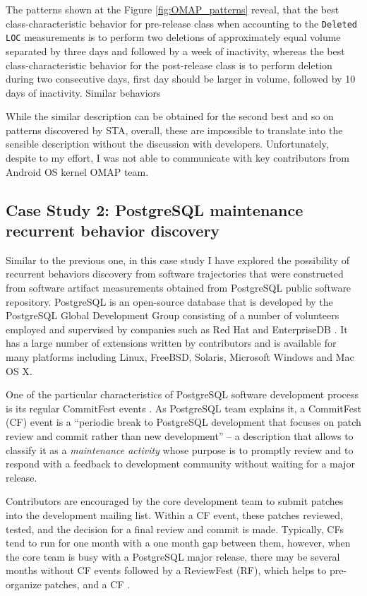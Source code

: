 The patterns shown at the Figure \ref{fig:OMAP_patterns} reveal, that the best class-characteristic behavior for pre-release class when accounting to the \texttt{Deleted LOC} measurements is to perform two deletions of approximately equal volume separated by three days and followed by a week of inactivity, whereas the best class-characteristic behavior for the post-release class is to perform deletion during two consecutive days, first day should be larger in volume, followed by 10 days of inactivity. Similar behaviors 

While the similar description can be obtained for the second best and so on patterns discovered by STA, overall, these are impossible to translate into the sensible description without the discussion with developers. Unfortunately, despite to my effort, I was not able to communicate with key contributors from Android OS kernel OMAP team.
\clearpage

\subsection{Case Study 2: PostgreSQL maintenance recurrent behavior discovery}
Similar to the previous one, in this case study I have explored the possibility of recurrent behaviors discovery from software trajectories that were constructed from software artifact measurements obtained from PostgreSQL public software repository. PostgreSQL is an open-source database that is developed by the PostgreSQL Global Development Group consisting of a number of volunteers employed and supervised by companies such as Red Hat and EnterpriseDB \cite{postgre-contrib}. It has a large number of extensions written by contributors and is available for many platforms including Linux, FreeBSD, Solaris, Microsoft Windows and Mac OS X.

One of the particular characteristics of PostgreSQL software development process is its regular CommitFest events \cite{postgre-commitfest}. As PostgreSQL team explains it, a CommitFest (CF) event is a ``periodic break to PostgreSQL development that focuses on patch review and commit rather than new development'' -- a description that allows to classify it as a \textit{maintenance activity} whose purpose is to promptly review and to respond with a feedback to development community without waiting for a major release.

Contributors are encouraged by the core development team to submit patches into the development mailing list. Within a CF event, these patches reviewed, tested, and the decision for a final review and commit is made.  Typically, CFs tend to run for one month with a one month gap between them, however, when the core team is busy with a PostgreSQL major release, there may be several months without CF events followed by a ReviewFest (RF), which helps to pre-organize patches, and a CF . 

